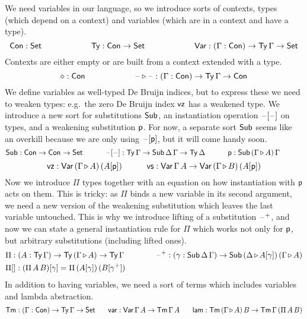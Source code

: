 \documentclass{easychair}
\begin{document}
We need variables in our language, so we introduce sorts of contexts,
types (which depend on a context) and variables (which are in a context and have a type).
\[
 \mathsf{Con} : \mathsf{Set} \hspace{6em} \mathsf{Ty} : \mathsf{Con}\rightarrow\mathsf{Set} \hspace{6em} \mathsf{Var} : (\Gamma:\mathsf{Con})\rightarrow\mathsf{Ty}\,\Gamma\rightarrow\mathsf{Set}  \\
\]
Contexts are either empty or are built from a context extended with a
type.
\[
\diamond : \mathsf{Con} \hspace{6em} \mathord{\hspace{1pt}\text{--}\hspace{1pt}}\mathop{\triangleright}\mathord{\hspace{1pt}\text{--}\hspace{1pt}} : (\Gamma:\mathsf{Con})\rightarrow\mathsf{Ty}\,\Gamma\rightarrow\mathsf{Con}
\]
We define variables as well-typed De Bruijn indices, but to express
these we need to weaken types: e.g.\ the zero De Bruijn index $\mathsf{vz}$
has a weakened type. We introduce a new sort for substitutions $\mathsf{Sub}$,
an instantiation operation $\mathord{\hspace{1pt}\text{--}\hspace{1pt}}[\mathord{\hspace{1pt}\text{--}\hspace{1pt}}]$ on types, and a weakening
substitution $\mathsf{p}$. For now, a separate sort $\mathsf{Sub}$ seems like an overkill because we
are only using $\mathord{\hspace{1pt}\text{--}\hspace{1pt}}[\mathsf{p}]$, but it will come handy soon.
\[
\mathsf{Sub}: \mathsf{Con}\rightarrow\mathsf{Con}\rightarrow\mathsf{Set} \hspace{3em} \mathord{\hspace{1pt}\text{--}\hspace{1pt}}[\mathord{\hspace{1pt}\text{--}\hspace{1pt}}] : \mathsf{Ty}\,\Gamma\rightarrow\mathsf{Sub}\,\Delta\,\Gamma\rightarrow\mathsf{Ty}\,\Delta \hspace{3em} \mathsf{p} : \mathsf{Sub}\,(\Gamma\mathop{\triangleright} A)\,\Gamma \hspace{3em}
\]
\[
\mathsf{vz} : \mathsf{Var}\,(\Gamma\mathop{\triangleright} A)\,(A[\mathsf{p}]) \hspace{3em} \mathsf{vs} : \mathsf{Var}\,\Gamma\,A\rightarrow\mathsf{Var}\,(\Gamma\mathop{\triangleright} B)\,(A[\mathsf{p}])
\]
Now we introduce $\Pi$ types together with an equation on how
instantiation with $\mathsf{p}$ acts on them. This is tricky: as $\Pi$ binds a
new variable in its second argument, we need a new version of the
weakening substitution which leaves the last variable untouched. This
is why we introduce lifting of a substitution $\mathord{\hspace{1pt}\text{--}\hspace{1pt}}^{+}$, and now we
can state a general instantiation rule for $\Pi$ which works not only
for $\mathsf{p}$, but arbitrary substitutions (including lifted ones).
\begin{alignat*}{10}
& \Pi:(A:\Ty\,\Gamma)\ra\Ty\,(\Gamma\ext A)\ra\Ty\,\Gamma \hspace{3em} && \blank^+ : (\gamma:\Sub\,\Delta\,\Gamma)\ra\Sub\,(\Delta\ext A[\gamma])\,(\Gamma\ext A) \\
& \Pi[] : (\Pi\,A\,B)[\gamma] = \Pi\,(A[\gamma])\,(B[\gamma^+])
\end{alignat*}
In addition to having variables, we need a sort of terms which
includes variables and lambda abstraction.
\[
\mathsf{Tm} : (\Gamma:\mathsf{Con})\rightarrow\mathsf{Ty}\,\Gamma\rightarrow\mathsf{Set} \hspace{1.8em} \mathsf{var} : \mathsf{Var}\,\Gamma\,A\rightarrow\mathsf{Tm}\,\Gamma\,A \hspace{1.8em} \mathsf{lam} : \mathsf{Tm}\,(\Gamma\mathop{\triangleright} A)\,B\rightarrow\mathsf{Tm}\,\Gamma\,(\Pi\,A\,B)  \\
\]
\end{document}
